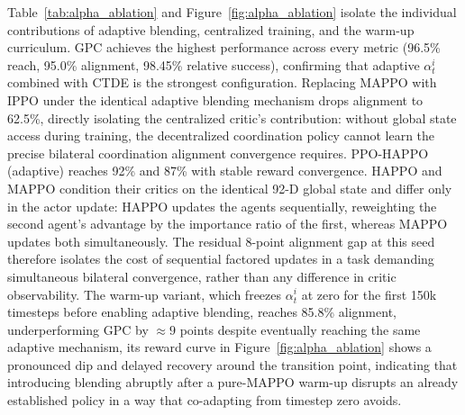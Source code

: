
Table~\ref{tab:alpha_ablation} and Figure~\ref{fig:alpha_ablation} isolate the individual
contributions of adaptive blending, centralized training, and the warm-up curriculum. GPC achieves
the highest performance across every metric (96.5\% reach, 95.0\% alignment, 98.45\% relative
success), confirming that adaptive $\alpha_t^i$ combined with CTDE is the strongest configuration.
Replacing MAPPO with IPPO under the identical adaptive blending mechanism drops alignment to 62.5\%,
directly isolating the centralized critic's contribution: without global state access during
training, the decentralized coordination policy cannot learn the precise bilateral coordination
alignment convergence requires. PPO-HAPPO (adaptive) reaches 92\% and 87\% with stable reward
convergence. HAPPO and MAPPO condition their critics on the identical 92-D global state and differ
only in the actor update: HAPPO updates the agents sequentially, reweighting the second agent's
advantage by the importance ratio of the first, whereas MAPPO updates both simultaneously. The
residual 8-point alignment gap at this seed therefore isolates the cost of sequential factored
updates in a task demanding simultaneous bilateral convergence, rather than any difference in critic
observability. The warm-up variant, which freezes $\alpha_t^i$ at zero for the
first 150k timesteps before enabling adaptive blending, reaches 85.8\% alignment, underperforming
GPC by $\approx 9$ points despite eventually reaching the same adaptive mechanism, its reward curve
in Figure~\ref{fig:alpha_ablation} shows a pronounced dip and delayed recovery around the transition
point, indicating that introducing blending abruptly after a pure-MAPPO warm-up disrupts an already
established policy in a way that co-adapting from timestep zero avoids.

